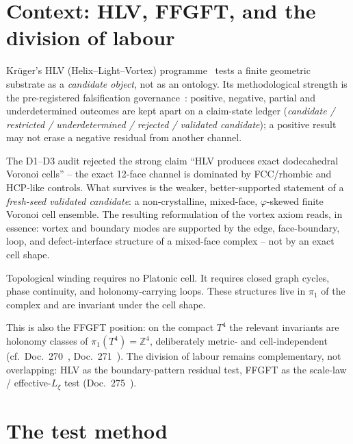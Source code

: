 \section{Context: HLV, FFGFT, and the division of labour}

Krüger's HLV (Helix--Light--Vortex) programme~\cite{krueger276main} tests a
finite geometric substrate as a \emph{candidate object}, not as an ontology.
Its methodological strength is the pre-registered falsification
governance~\cite{krueger276gov}: positive, negative, partial and
underdetermined outcomes are kept apart on a claim-state ledger
(\emph{candidate / restricted / underdetermined / rejected / validated
candidate}); a positive result may not erase a negative residual from another
channel.

The D1--D3 audit rejected the strong claim ``HLV produces exact dodecahedral
Voronoi cells'' -- the exact 12-face channel is dominated by FCC/rhombic and
HCP-like controls. What survives is the weaker, better-supported statement of
a \emph{fresh-seed validated candidate}: a non-crystalline, mixed-face,
$\varphi$-skewed finite Voronoi cell ensemble. The resulting reformulation of
the vortex axiom reads, in essence: vortex and boundary modes are supported by
the edge, face-boundary, loop, and defect-interface structure of a mixed-face
complex -- not by an exact cell shape.

\begin{observation*}
Topological winding requires no Platonic cell. It requires closed graph
cycles, phase continuity, and holonomy-carrying loops. These structures live
in $\pi_1$ of the complex and are invariant under the cell shape.
\end{observation*}

This is also the FFGFT position: on the compact $T^4$ the relevant invariants
are holonomy classes of $\pi_1(T^4)=\mathbb{Z}^4$, deliberately metric- and
cell-independent (cf.\ Doc.~270~\cite{dok270}, Doc.~271~\cite{dok271}). The
division of labour remains complementary, not overlapping: HLV as the
boundary-pattern residual test, FFGFT as the scale-law / effective-$L_\xi$
test (Doc.~275~\cite{dok275}).

\section{The test method}


